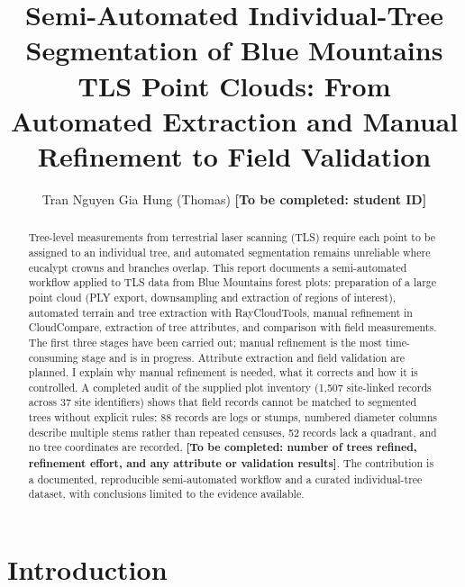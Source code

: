\documentclass[runningheads]{llncs}
\newcommand{\todo}[1]{\textbf{[To be completed: #1]}}
\begin{document}
\title{Semi-Automated Individual-Tree Segmentation of Blue Mountains TLS Point Clouds: From Automated Extraction and Manual Refinement to Field Validation}
\author{Tran Nguyen Gia Hung (Thomas) \todo{student ID}}
\maketitle

\begin{abstract}
Tree-level measurements from terrestrial laser scanning (TLS) require each point to be assigned to an individual tree, and automated segmentation remains unreliable where eucalypt crowns and branches overlap. This report documents a semi-automated workflow applied to TLS data from Blue Mountains forest plots: preparation of a large point cloud (PLY export, downsampling and extraction of regions of interest), automated terrain and tree extraction with RayCloudTools, manual refinement in CloudCompare, extraction of tree attributes, and comparison with field measurements. The first three stages have been carried out; manual refinement is the most time-consuming stage and is in progress. Attribute extraction and field validation are planned. I explain why manual refinement is needed, what it corrects and how it is controlled. A completed audit of the supplied plot inventory (1,507 site-linked records across 37 site identifiers) shows that field records cannot be matched to segmented trees without explicit rules: 88 records are logs or stumps, numbered diameter columns describe multiple stems rather than repeated censuses, 52 records lack a quadrant, and no tree coordinates are recorded. \todo{number of trees refined, refinement effort, and any attribute or validation results}. The contribution is a documented, reproducible semi-automated workflow and a curated individual-tree dataset, with conclusions limited to the evidence available.
\end{abstract}

\section{Introduction}\label{sec:intro}
\end{document}
